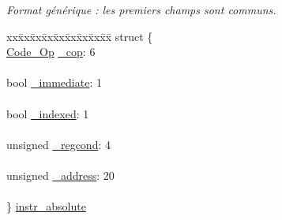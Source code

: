 \begin{DoxyCompactItemize}
\begin{tabbing}
\end{tabbing}\begin{DoxyCompactList}\small\item\em \-Format générique \-: les premiers champs sont communs. \end{DoxyCompactList}\item 
\begin{tabbing}
xx\=xx\=xx\=xx\=xx\=xx\=xx\=xx\=xx\=\kill
struct \{\\
\>\hyperlink{instruction_8h_a5ead9d7413d75b14e895c945daa82de6}{Code\_Op} \hyperlink{union_instruction_a2eef4c29da07a7afefa510530aeabe8b}{\_cop}: 6\\
\>\\
\>bool \hyperlink{union_instruction_ae8f0aed9ccc5cc06e0689f32c409787d}{\_immediate}: 1\\
\>\\
\>bool \hyperlink{union_instruction_a49ff74dcae74d84b5fce96090bcbcd14}{\_indexed}: 1\\
\>\\
\>unsigned \hyperlink{union_instruction_aacc0d299ebbd857ec008b3c9e2ae2cd0}{\_regcond}: 4\\
\>\\
\>unsigned \hyperlink{union_instruction_a7d8f71662d751668bc08cbac1c529124}{\_address}: 20\\
\>\\
\} \hyperlink{union_instruction_aad60aa5074ecb500e3a90bae25b7e27a}{instr\_absolute}\\


\end{tabbing}
\end{DoxyCompactItemize}
